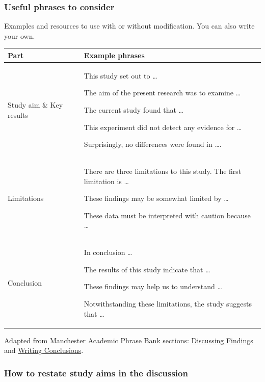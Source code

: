 \documentclass[
  openany]{book}
\begin{document}
\hypertarget{useful-phrases-to-consider}{%
\subsubsection{Useful phrases to consider}\label{useful-phrases-to-consider}}

Examples and resources to use with or without modification. You can also write your own.

\begin{longtable}[]{@{}
  >{\raggedright\arraybackslash}p{}
  >{\raggedright\arraybackslash}p{}@{}}
\toprule
Part & Example phrases \\
\midrule
\endhead
Study aim \& Key results & This study set out to \ldots{}

The aim of the present research was to examine \ldots{}

The current study found that \ldots{}

This experiment did not detect any evidence for \ldots{}

Surprisingly, no differences were found in \ldots. \\
Limitations & There are three limitations to this study. The first limitation is \ldots{}

These findings may be somewhat limited by \ldots{}

These data must be interpreted with caution because \ldots{} \\
Conclusion & In conclusion \ldots{}

The results of this study indicate that \ldots{}

These findings may help us to understand \ldots{}

Notwithstanding these limitations, the study suggests that \ldots{} \\
\bottomrule
\end{longtable}

Adapted from Manchester Academic Phrase Bank sections: \href{https://www.phrasebank.manchester.ac.uk/discussing-findings/}{Discussing Findings} and \href{https://www.phrasebank.manchester.ac.uk/writing-conclusions/}{Writing Conclusions}.

\hypertarget{how-to-restate-study-aims-in-the-discussion}{%
\subsubsection{How to restate study aims in the discussion}\label{how-to-restate-study-aims-in-the-discussion}}
\end{document}
